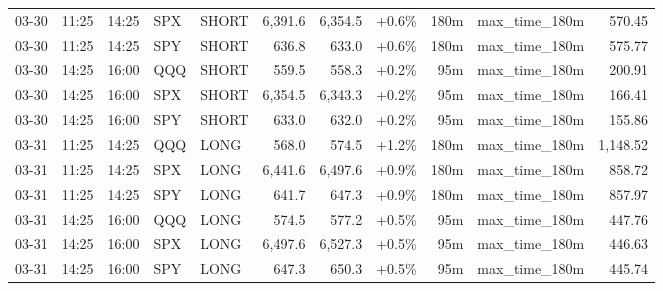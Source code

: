 \documentclass[11pt,a4paper,twoside]{article}
\begin{document}
\begin{center}
\begin{longtable}{>{\color{txtmain}}l l l l l r r r r >{\color{txtmain}}l r}
03-30 & 11:25 & 14:25 & SPX & SHORT & 6,391.6 & 6,354.5 & \textcolor{wingreen}{+0.6\%} & 180m & max\_time\_180m & \textcolor{wingreen}{570.45} \\
03-30 & 11:25 & 14:25 & SPY & SHORT & 636.8 & 633.0 & \textcolor{wingreen}{+0.6\%} & 180m & max\_time\_180m & \textcolor{wingreen}{575.77} \\
03-30 & 14:25 & 16:00 & QQQ & SHORT & 559.5 & 558.3 & \textcolor{wingreen}{+0.2\%} & 95m & max\_time\_180m & \textcolor{wingreen}{200.91} \\
03-30 & 14:25 & 16:00 & SPX & SHORT & 6,354.5 & 6,343.3 & \textcolor{wingreen}{+0.2\%} & 95m & max\_time\_180m & \textcolor{wingreen}{166.41} \\
03-30 & 14:25 & 16:00 & SPY & SHORT & 633.0 & 632.0 & \textcolor{wingreen}{+0.2\%} & 95m & max\_time\_180m & \textcolor{wingreen}{155.86} \\
03-31 & 11:25 & 14:25 & QQQ & LONG & 568.0 & 574.5 & \textcolor{wingreen}{+1.2\%} & 180m & max\_time\_180m & \textcolor{wingreen}{1,148.52} \\
03-31 & 11:25 & 14:25 & SPX & LONG & 6,441.6 & 6,497.6 & \textcolor{wingreen}{+0.9\%} & 180m & max\_time\_180m & \textcolor{wingreen}{858.72} \\
03-31 & 11:25 & 14:25 & SPY & LONG & 641.7 & 647.3 & \textcolor{wingreen}{+0.9\%} & 180m & max\_time\_180m & \textcolor{wingreen}{857.97} \\
03-31 & 14:25 & 16:00 & QQQ & LONG & 574.5 & 577.2 & \textcolor{wingreen}{+0.5\%} & 95m & max\_time\_180m & \textcolor{wingreen}{447.76} \\
03-31 & 14:25 & 16:00 & SPX & LONG & 6,497.6 & 6,527.3 & \textcolor{wingreen}{+0.5\%} & 95m & max\_time\_180m & \textcolor{wingreen}{446.63} \\
03-31 & 14:25 & 16:00 & SPY & LONG & 647.3 & 650.3 & \textcolor{wingreen}{+0.5\%} & 95m & max\_time\_180m & \textcolor{wingreen}{445.74} \\
\end{longtable}
\end{center}
\clearpage
\end{document}
